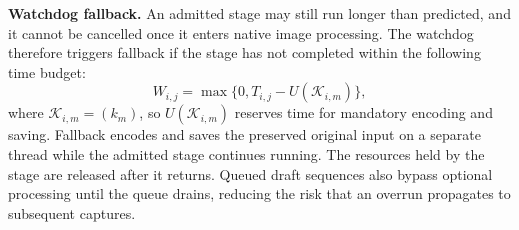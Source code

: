 \smallskip\noindent\textbf{Watchdog fallback.}
An admitted stage may still run longer than predicted, and it cannot be cancelled once it enters native image processing.
The watchdog therefore triggers fallback if the stage has not completed within the following time budget:
\begin{equation*}
  W_{i,j}=\max\{0,T_{i,j}-U(\mathcal{K}_{i,m})\},
\end{equation*}
where \(\mathcal{K}_{i,m}=(k_m)\), so \(U(\mathcal K_{i,m})\) reserves time for mandatory encoding and saving.
Fallback encodes and saves the preserved original input on a separate thread while the admitted stage continues running.
The resources held by the stage are released after it returns.
Queued draft sequences also bypass optional processing until the queue drains, reducing the risk that an overrun propagates to subsequent captures.
